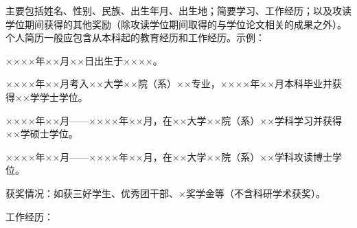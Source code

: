 \begin{profile}

主要包括姓名、性别、民族、出生年月、出生地；简要学习、工作经历；以及攻读学位期间获得的其他奖励（除攻读学位期间取得的与学位论文相关的成果之外）。个人简历一般应包含从本科起的教育经历和工作经历。示例：

××××年××月××日出生于××××。

××××年××月考入××大学××院（系）××专业，××××年××月本科毕业并获得××学学士学位。

××××年××月——××××年××月，在××大学××院（系）××学科学习并获得××学硕士学位。

××××年××月——××××年××月，在××大学××院（系）××学科攻读博士学位。

获奖情况：如获三好学生、优秀团干部、×奖学金等（不含科研学术获奖）。

工作经历：

\end{profile}
